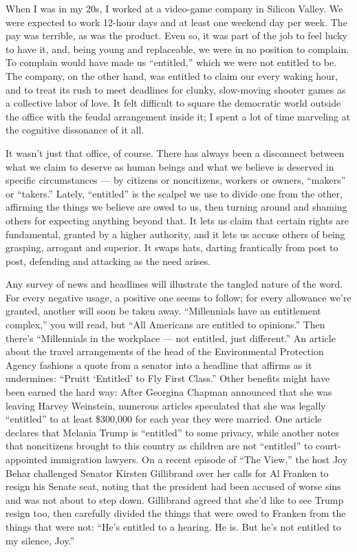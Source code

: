 When I was in my 20s, I worked at a video-game company in Silicon
Valley. We were expected to work 12-hour days and at least one weekend
day per week. The pay was terrible, as was the product. Even so, it was
part of the job to feel lucky to have it, and, being young and
replaceable, we were in no position to complain. To complain would have
made us ``entitled,'' which we were not entitled to be. The company, on
the other hand, was entitled to claim our every waking hour, and to
treat its rush to meet deadlines for clunky, slow-moving shooter games
as a collective labor of love. It felt difficult to square the
democratic world outside the office with the feudal arrangement inside
it; I spent a lot of time marveling at the cognitive dissonance of it
all.

It wasn't just that office, of course. There has always been a
disconnect between what we claim to deserve as human beings and what we
believe is deserved in specific circumstances --- by citizens or
noncitizens, workers or owners, ``makers'' or ``takers.'' Lately,
``entitled'' is the scalpel we use to divide one from the other,
affirming the things we believe are owed to us, then turning around and
shaming others for expecting anything beyond that. It lets us claim that
certain rights are fundamental, granted by a higher authority, and it
lets us accuse others of being grasping, arrogant and superior. It swaps
hats, darting frantically from post to post, defending and attacking as
the need arises.

Any survey of news and headlines will illustrate the tangled nature of
the word. For every negative usage, a positive one seems to follow; for
every allowance we're granted, another will soon be taken away.
``Millennials have an entitlement complex,'' you will read, but ``All
Americans are entitled to opinions.'' Then there's ``Millennials in the
workplace --- not entitled, just different.'' An article about the
travel arrangements of the head of the Environmental Protection Agency
fashions a quote from a senator into a headline that affirms as it
undermines: ``Pruitt `Entitled' to Fly First Class.'' Other benefits
might have been earned the hard way: After Georgina Chapman announced
that she was leaving Harvey Weinstein, numerous articles speculated that
she was legally ``entitled'' to at least \$300,000 for each year they
were married. One article declares that Melania Trump is ``entitled'' to
some privacy, while another notes that noncitizens brought to this
country as children are not ``entitled'' to court-appointed immigration
lawyers. On a recent episode of ``The View,'' the host Joy Behar
challenged Senator Kirsten Gillibrand over her calls for Al Franken to
resign his Senate seat, noting that the president had been accused of
worse sins and was not about to step down. Gillibrand agreed that she'd
like to see Trump resign too, then carefully divided the things that
were owed to Franken from the things that were not: ``He's entitled to a
hearing. He is. But he's not entitled to my silence, Joy.''

